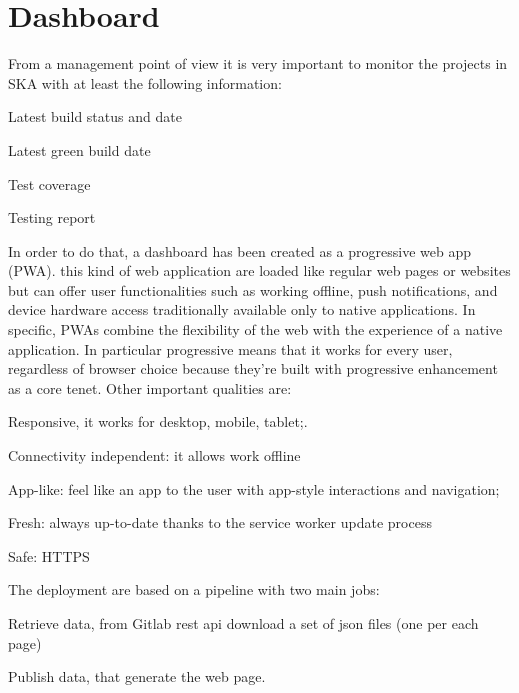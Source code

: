 \documentclass[a4paper,
               keeplastbox,   %
               ]{jacow}
\begin{document}
\section{Dashboard}
From a management point of view it is very important to monitor the projects in SKA with at least the following information: 
\begin{Itemize}
    \item Latest build status and date
    \item Latest green build date
    \item Test coverage
    \item Testing report
\end{Itemize}

In order to do that, a dashboard has been created as a progressive web app (PWA). this kind of web application are loaded like regular web pages or websites but can offer user functionalities such as working offline, push notifications, and device hardware access traditionally available only to native applications. In specific, PWAs combine the flexibility of the web with the experience of a native application. In particular progressive means that it works for every user, regardless of browser choice because they're built with progressive enhancement as a core tenet. Other important qualities are: 
\begin{Itemize}
    \item Responsive, it works for desktop, mobile, tablet;.
    \item Connectivity independent: it allows work offline
    \item App-like: feel like an app to the user with app-style interactions and navigation;
    \item Fresh: always up-to-date thanks to the service worker update process 
    \item Safe: HTTPS
\end{Itemize}

The deployment are based on a pipeline with two main jobs:
\begin{Itemize}
    \item Retrieve data, from Gitlab rest api download a set of json files (one per each page)
    \item Publish data, that generate the web page.
\end{Itemize}
\end{document}
